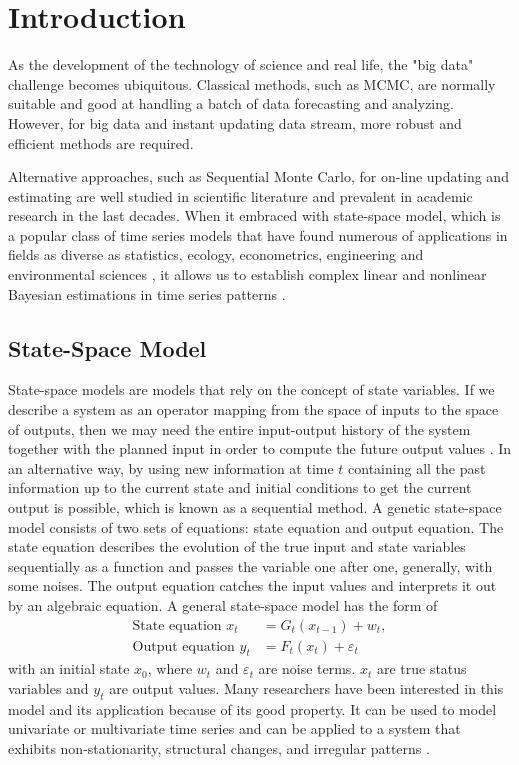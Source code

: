 
\section{Introduction}

As the development of the technology of science and real life, the "big data" challenge becomes ubiquitous. Classical methods, such as MCMC, are normally suitable and good at handling a batch of data forecasting and analyzing. However, for big data and instant updating data stream, more robust and efficient methods are required. 


Alternative approaches, such as Sequential Monte Carlo, for on-line updating and estimating are well studied in scientific literature and prevalent in academic research in the last decades. When it embraced with  state-space model, which is a popular class of time series models that have found numerous of applications in fields as diverse as statistics, ecology, econometrics, engineering and environmental sciences \citep{cappe2009inference, smcmip2011, elliott1995estimation, cargnoni1997bayesian}, it allows us to establish complex linear and nonlinear Bayesian estimations in time series patterns \citep{vieira2016online}. 


\subsection*{State-Space Model}

State-space models are models that rely on the concept of state variables. If we describe a system as an operator mapping from the space of inputs to the space of outputs, then we may need the entire input-output history of the system together with the planned input in order to compute the future output values \citep{hangos2006analysis}. In an alternative way, by using new information at time $t$ containing all the past information up to the current state and initial conditions to get the current output is possible, which is known as a sequential method. A genetic state-space model consists of two sets of equations: state equation and output equation. The state equation describes the evolution of the true input and state variables sequentially as a function and passes the variable one after one, generally, with some noises. The output equation catches the input values and interprets it out by an algebraic equation. A general state-space model has the form of 
\begin{align}\label{statemodel1}
\mbox{State equation } x_t &= G_t(x_{t-1})+w_t,\\
\label{statemodel2}
\mbox{Output equation } y_t &=F_t(x_t)+\varepsilon_t
\end{align}
with an initial state $x_0$, where $w_t$ and $\varepsilon_t$ are noise terms. $x_t$ are true status variables and $y_t$ are output values. Many researchers have been interested in this model and its application because of its good property. It can be used to model univariate or multivariate time series and can be applied to a system that exhibits non-stationarity, structural changes, and irregular patterns \citep{petris2009dynamic}.

